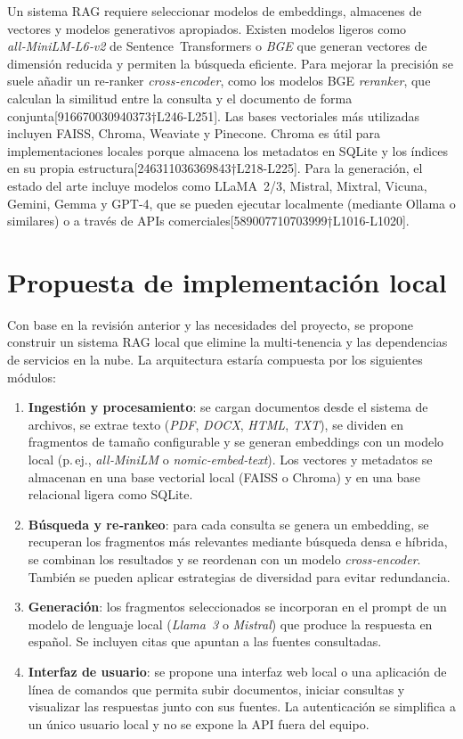 Un sistema RAG requiere seleccionar modelos de embeddings, almacenes de vectores y modelos generativos apropiados.  Existen modelos ligeros como \textit{all‑MiniLM‑L6‑v2} de Sentence Transformers o \textit{BGE} que generan vectores de dimensión reducida y permiten la búsqueda eficiente.  Para mejorar la precisión se suele añadir un re‑ranker \textit{cross‑encoder}, como los modelos BGE \textit{reranker}, que calculan la similitud entre la consulta y el documento de forma conjunta[916670030940373†L246-L251].  Las bases vectoriales más utilizadas incluyen FAISS, Chroma, Weaviate y Pinecone.  Chroma es útil para implementaciones locales porque almacena los metadatos en SQLite y los índices en su propia estructura[246311036369843†L218-L225].  Para la generación, el estado del arte incluye modelos como LLaMA 2/3, Mistral, Mixtral, Vicuna, Gemini, Gemma y GPT‑4, que se pueden ejecutar localmente (mediante Ollama o similares) o a través de APIs comerciales[589007710703999†L1016-L1020].

\section{Propuesta de implementación local}

Con base en la revisión anterior y las necesidades del proyecto, se propone construir un sistema RAG local que elimine la multi‑tenencia y las dependencias de servicios en la nube.  La arquitectura estaría compuesta por los siguientes módulos:

\begin{enumerate}
  \item \textbf{Ingestión y procesamiento}: se cargan documentos desde el sistema de archivos, se extrae texto (\textit{PDF}, \textit{DOCX}, \textit{HTML}, \textit{TXT}), se dividen en fragmentos de tamaño configurable y se generan embeddings con un modelo local (p.\,ej., \textit{all‑MiniLM} o \textit{nomic‑embed‑text}).  Los vectores y metadatos se almacenan en una base vectorial local (FAISS o Chroma) y en una base relacional ligera como SQLite.
  \item \textbf{Búsqueda y re‑rankeo}: para cada consulta se genera un embedding, se recuperan los fragmentos más relevantes mediante búsqueda densa e híbrida, se combinan los resultados y se reordenan con un modelo \textit{cross‑encoder}.  También se pueden aplicar estrategias de diversidad para evitar redundancia.
  \item \textbf{Generación}: los fragmentos seleccionados se incorporan en el prompt de un modelo de lenguaje local (\textit{Llama 3} o \textit{Mistral}) que produce la respuesta en español.  Se incluyen citas que apuntan a las fuentes consultadas.
  \item \textbf{Interfaz de usuario}: se propone una interfaz web local o una aplicación de línea de comandos que permita subir documentos, iniciar consultas y visualizar las respuestas junto con sus fuentes.  La autenticación se simplifica a un único usuario local y no se expone la API fuera del equipo.
\end{enumerate}

